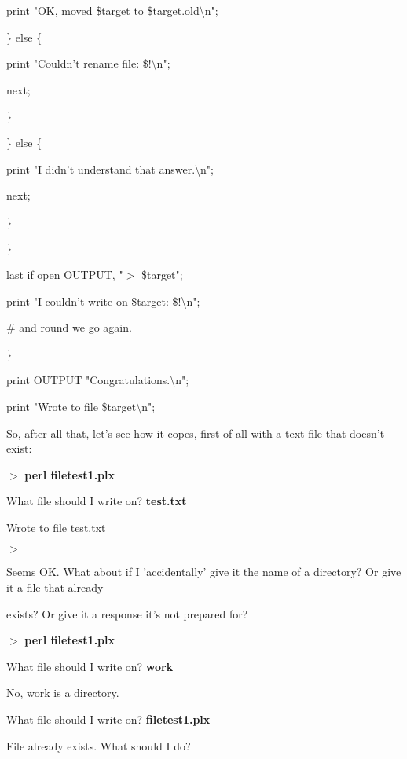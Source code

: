 \documentclass[a4paper,11pt]{book}
\begin{document}
\noindent print "OK, moved \$target to \$target.old\textbackslash n";

\noindent \} else \{

\noindent print "Couldn't rename file: \$!\textbackslash n";

\noindent next;

\noindent \}

\noindent \} else \{

\noindent print "I didn't understand that answer.\textbackslash n";

\noindent next;

\noindent \}

\noindent \}

\noindent last if open OUTPUT, "$>$ \$target";

\noindent print "I couldn't write on \$target: \$!\textbackslash n";

\noindent \# and round we go again.

\noindent \}

\noindent print OUTPUT "Congratulations.\textbackslash n";

\noindent print "Wrote to file \$target\textbackslash n";

\noindent 

\noindent So, after all that, let's see how it copes, first of all with a text file that doesn't exist:

\noindent 

\noindent $>$ \textbf{perl filetest1.plx}

\noindent What file should I write on? \textbf{test.txt}

\noindent Wrote to file test.txt

\noindent $>$

\noindent 

\noindent 

\noindent Seems OK. What about if I 'accidentally' give it the name of a directory? Or give it a file that already

\noindent exists? Or give it a response it's not prepared for?

\noindent 

\noindent $>$ \textbf{perl filetest1.plx}

\noindent What file should I write on? \textbf{work}

\noindent No, work is a directory.

\noindent What file should I write on? \textbf{filetest1.plx}

\noindent File already exists. What should I do?
\end{document}
